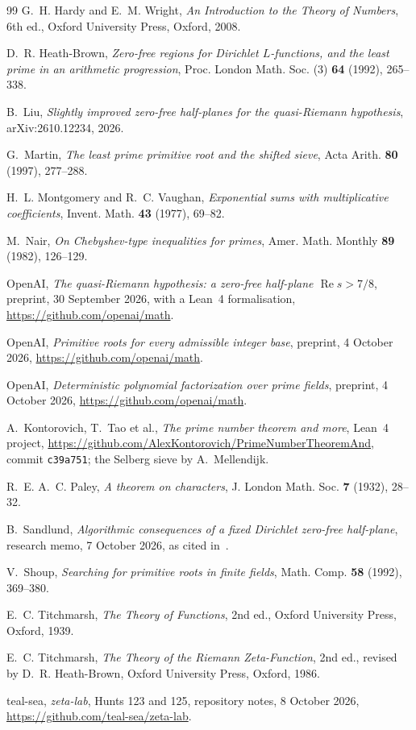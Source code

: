 \documentclass[12pt]{amsart}
\theoremstyle{remark}
\renewcommand{\Re}{\operatorname{Re}}
\begin{document}
\begin{thebibliography}{99}
 G.~H. Hardy and E.~M. Wright, \emph{An Introduction to the Theory of Numbers},
6th ed., Oxford University Press, Oxford, 2008.

 D.~R. Heath-Brown, \emph{Zero-free regions for Dirichlet $L$-functions, and the
least prime in an arithmetic progression}, Proc. London Math. Soc. (3) \textbf{64} (1992),
265--338.

 B.~Liu, \emph{Slightly improved zero-free half-planes for the
quasi-Riemann hypothesis}, arXiv:2610.12234, 2026.

 G.~Martin, \emph{The least prime primitive root and the shifted sieve}, Acta
Arith. \textbf{80} (1997), 277--288.

 H.~L. Montgomery and R.~C. Vaughan, \emph{Exponential sums with multiplicative
coefficients}, Invent. Math. \textbf{43} (1977), 69--82.

 M.~Nair, \emph{On Chebyshev-type inequalities for primes}, Amer. Math. Monthly
\textbf{89} (1982), 126--129.

 OpenAI, \emph{The quasi-Riemann hypothesis: a zero-free half-plane
$\Re s>7/8$}, preprint, 30 September 2026, with a Lean~4 formalisation,
\url{https://github.com/openai/math}.

 OpenAI, \emph{Primitive roots for every admissible integer base}, preprint,
4 October 2026, \url{https://github.com/openai/math}.

 OpenAI, \emph{Deterministic polynomial factorization over prime fields},
preprint, 4 October 2026, \url{https://github.com/openai/math}.

 A.~Kontorovich, T.~Tao et al., \emph{The prime number theorem and more}, Lean~4
project, \url{https://github.com/AlexKontorovich/PrimeNumberTheoremAnd}, commit
\texttt{c39a751}; the Selberg sieve by A.~Mellendijk.

 R.~E. A.~C. Paley, \emph{A theorem on characters}, J. London Math. Soc.
\textbf{7} (1932), 28--32.

 B.~Sandlund, \emph{Algorithmic consequences of a fixed Dirichlet zero-free
half-plane}, research memo, 7 October 2026, as cited in~\cite[\S6.4]{Guo26}.

 V.~Shoup, \emph{Searching for primitive roots in finite fields}, Math. Comp.
\textbf{58} (1992), 369--380.

 E.~C. Titchmarsh, \emph{The Theory of Functions}, 2nd ed., Oxford University
Press, Oxford, 1939.

 E.~C. Titchmarsh, \emph{The Theory of the Riemann Zeta-Function}, 2nd ed.,
revised by D.~R. Heath-Brown, Oxford University Press, Oxford, 1986.

 teal-sea, \emph{zeta-lab}, Hunts 123 and 125, repository notes, 8 October 2026,
\url{https://github.com/teal-sea/zeta-lab}.

\end{thebibliography}
\end{document}
